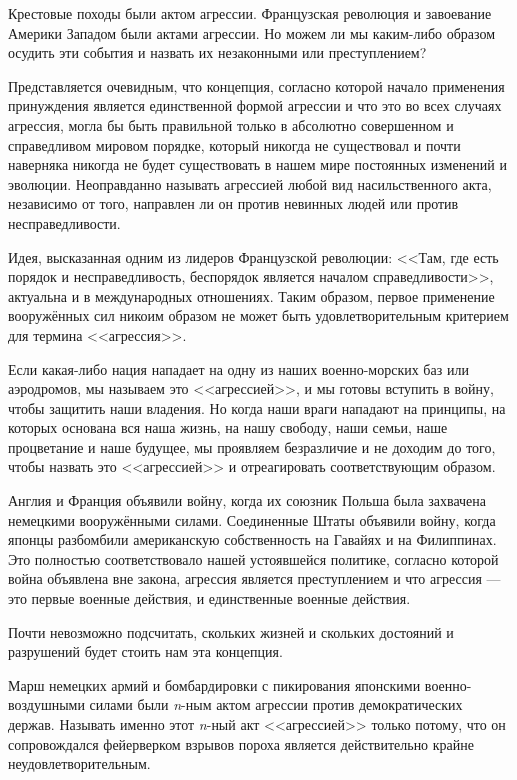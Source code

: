 Крестовые походы были актом агрессии. Французская революция и завоевание Америки Западом были актами агрессии. Но можем ли мы каким-либо образом осудить эти события и назвать их незаконными или преступлением?
 
Представляется очевидным, что концепция, согласно которой начало применения принуждения является единственной формой агрессии и что это во всех случаях агрессия, могла бы быть правильной только в абсолютно совершенном и справедливом мировом порядке, который никогда не существовал и почти наверняка никогда не будет существовать в нашем мире постоянных изменений и эволюции. Неоправданно называть агрессией любой вид насильственного акта, независимо от того, направлен ли он против невинных людей или против несправедливости.

Идея, высказанная одним из лидеров Французской революции: <<Там, где есть порядок и несправедливость, беспорядок является началом справедливости>>, актуальна и в международных отношениях. Таким образом, первое применение вооружённых сил никоим образом не может быть удовлетворительным критерием для термина <<агрессия>>.
 
Если какая-либо нация нападает на одну из наших военно-морских баз или аэродромов, мы называем это <<агрессией>>, и мы готовы вступить в войну, чтобы защитить наши владения. Но когда наши враги нападают на принципы, на которых основана вся наша жизнь, на нашу свободу, наши семьи, наше процветание и наше будущее, мы проявляем безразличие и не доходим до того, чтобы назвать это <<агрессией>> и отреагировать соответствующим образом.

Англия и Франция объявили войну, когда их союзник Польша была захвачена немецкими вооружёнными силами. Соединенные Штаты объявили войну, когда японцы разбомбили американскую собственность на Гавайях и на Филиппинах. Это полностью соответствовало нашей устоявшейся политике, согласно которой война объявлена вне закона, агрессия является преступлением и что агрессия — это первые военные действия, и единственные военные действия.
 
Почти невозможно подсчитать, скольких жизней и скольких достояний и разрушений будет стоить нам эта концепция.

Марш немецких армий и бомбардировки с пикирования японскими военно-воздушными силами были \textit{n}-ным актом агрессии против демократических держав. Называть именно этот \textit{n}-ный акт <<агрессией>> только потому, что он сопровождался фейерверком взрывов пороха является действительно крайне неудовлетворительным.
 
